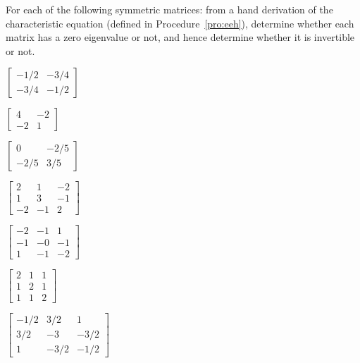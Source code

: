\begin{exercise} \label{ex:} 
For each of the following symmetric matrices: from a hand derivation of the characteristic equation (defined in Procedure~\ref{pro:eeh}), determine whether each matrix has a zero eigenvalue or not, and hence determine whether it is invertible or not.
\begin{parts}
\item \(\begin{bmatrix} -1/2 & -3/4
\\ -3/4 & -1/2 \end{bmatrix}\)

\item \(\begin{bmatrix} 4 & -2
\\ -2 & 1 \end{bmatrix}\)

\item \(\begin{bmatrix} 0 & -2/5
\\ -2/5 & 3/5 \end{bmatrix}\)

\item \(\begin{bmatrix} 2 & 1 & -2
\\ 1 & 3 & -1
\\ -2 & -1 & 2 \end{bmatrix}\)

\item \(\begin{bmatrix} -2 & -1 & 1
\\ -1 & -0 & -1
\\ 1 & -1 & -2 \end{bmatrix}\)

\item \(\begin{bmatrix} 2 & 1 & 1
\\ 1 & 2 & 1
\\ 1 & 1 & 2 \end{bmatrix}\)

\item \(\begin{bmatrix} -1/2 & 3/2 & 1
\\ 3/2 & -3 & -3/2
\\ 1 & -3/2 & -1/2 \end{bmatrix}\)


\end{parts}
\end{exercise}
